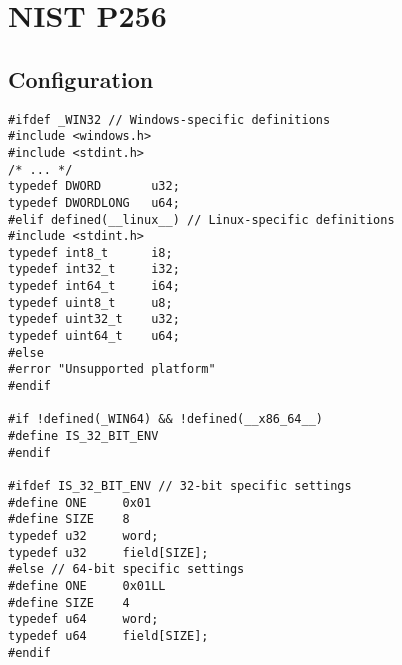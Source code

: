\chapter{NIST P256}
\iffalse
\section{Time Measure in Linux}

\begin{lstlisting}[style=C]
#define _POSIX_C_SOURCE 200809L
#include <time.h>

typedef int8_t i8;
typedef int32_t i32;
typedef int64_t i64;

typedef uint8_t u8;
typedef uint32_t u32;
typedef uint64_t u64;

inline u64 rdtsc(void) {
	u32 lo, hi;
	
	__asm__ __volatile__ (
	"rdtsc" : "=a" (lo), "=d" (hi)
	);
	
	return ((u64)hi << 32) | lo;
}

u64 measure_cycle(void (*func)(u8*, u8*), u8* para1, u8* para2) {
	u64 start, end;
	const u64 num_runs = 10000;
	
	func(para1, para2);
	start = rdtsc();
	for (i32 i = 0; i < num_runs; i++)
		func(para1, para2);
	end = rdtsc();
	
	return (end - start) / num_runs;
}

double measure_time(void (*func)(u8*, u8*), u8* para1, u8* para2) {
	struct timespec start, end;
	double cpu_time_used;
	const double num_runs = 10000;
	
	func(para1, para2);
	clock_gettime(CLOCK_MONOTONIC, &start);
	for (i32 i = 0; i < num_runs; i++)
		func(para1, para2);
	clock_gettime(CLOCK_MONOTONIC, &end);
	
	cpu_time_used =
		(end.tv_sec - start.tv_sec) +
		(end.tv_nsec - start.tv_nsec) / 1e9;
	
	return cpu_time_used / num_runs;
}
\end{lstlisting}
\fi

\section*{Configuration}
\begin{lstlisting}[style=C]
#ifdef _WIN32 // Windows-specific definitions
#include <windows.h>
#include <stdint.h>
/* ... */
typedef DWORD       u32;
typedef DWORDLONG   u64;
#elif defined(__linux__) // Linux-specific definitions
#include <stdint.h>
typedef int8_t      i8;
typedef int32_t     i32;
typedef int64_t     i64;
typedef uint8_t     u8;
typedef uint32_t    u32;
typedef uint64_t    u64;
#else
#error "Unsupported platform"
#endif

#if !defined(_WIN64) && !defined(__x86_64__)
#define IS_32_BIT_ENV
#endif

#ifdef IS_32_BIT_ENV // 32-bit specific settings
#define ONE     0x01
#define SIZE    8
typedef u32     word;
typedef u32     field[SIZE];
#else // 64-bit specific settings
#define ONE     0x01LL
#define SIZE    4
typedef u64     word;
typedef u64     field[SIZE];
#endif
\end{lstlisting}


